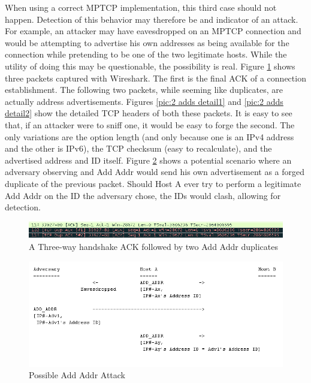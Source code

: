 When using a correct MPTCP implementation, this third case should not happen. Detection of this behavior may therefore be and indicator of an attack. For example, an attacker may have eavesdropped on an MPTCP connection and would be attempting to advertise his own addresses as being available for the connection while pretending to be one of the two legitimate hosts. While the utility of doing this may be questionable, the possibility is real. Figure \ref{pic:2 adds} shows three packets captured with Wireshark. The first is the final ACK of a connection establishment. The following two packets, while seeming like duplicates, are actually address advertisements. Figures \ref{pic:2 adds detail1} and \ref{pic:2 adds detail2} show the detailed TCP headers of both these packets. It is easy to see that, if an attacker were to sniff one, it would be easy to forge the second. The only variations are the option length (and only because one is an IPv4 address and the other is IPv6), the TCP checksum (easy to recalculate), and the advertised address and ID itself.  Figure \ref{pic:2 add attack} shows a potential scenario where an adversary observing and Add Addr would send his own advertisement as a forged duplicate of the previous packet. Should Host A ever try to perform a legitimate Add Addr on the ID the adversary chose, the IDs would clash, allowing for detection.  \\

\begin{figure}[!t]
\centering
\includegraphics[scale = 0.6]{Figures/2addaddrwireshark.png}
\caption{A Three-way handshake ACK followed by two Add Addr duplicates}
\label{pic:2 adds}
\end{figure}

\begin{figure}[!t]
\centering
\includegraphics[scale = 0.6]{Figures/addaddrattack.png}
\caption{Possible Add Addr Attack}
\label{pic:2 add attack}
\end{figure}

